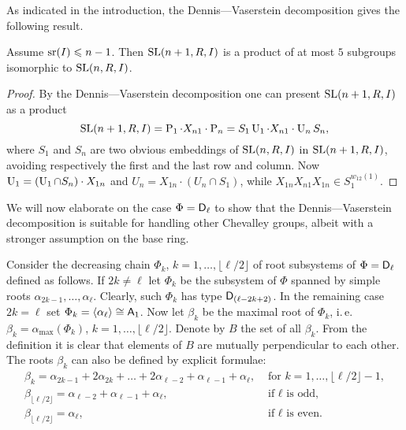 As indicated in the introduction, the Dennis---Vaserstein decomposition gives the following result.
\begin{lemma}
Assume $\operatorname{sr}(I)\leqslant n-1$. Then $\operatorname{SL}(n+1,R,I)$ is a product of at most $5$ subgroups isomorphic to $\operatorname{SL}(n,R,I)$.
\end{lemma}
\begin{proof}
By the Dennis---Vaserstein decomposition one can present $\operatorname{SL}(n+1,R,I)$ as a product
\[ \operatorname{SL}(n+1,R,I) =  \operatorname{P}_1\cdot X_{n1}\cdot\operatorname{P}_n=S_1\operatorname{U}_1\cdot X_{n1}\cdot\operatorname{U}_n S_n, \]
where $S_1$ and $S_n$ are two obvious embeddings of $\operatorname{SL}(n,R,I)$ in $\operatorname{SL}(n+1,R,I)$, avoiding respectively the first and the last row and column. Now $\operatorname{U}_1=(\operatorname{U}_1\cap S_n)\cdot X_{1n}$ and $U_n= X_{1n}\cdot(U_n\cap S_1)$, while $X_{1n}X_{n1}X_{1n}\in S_1^{w_{12}(1)}$.
\end{proof}
We will now elaborate on the case $\Phi=\mathsf{D}_\ell$ to show that the Dennis---Vaserstein decomposition is suitable for handling other Chevalley groups, albeit with a stronger assumption on the base ring. 

Consider the decreasing chain $\Phi_k$, $k=1,\ldots, \lfloor \ell/2 \rfloor$ of root subsystems of $\Phi=\mathsf{D}_\ell$ defined as follows.
If $2k \neq \ell$ let $\Phi_k$ be the subsystem of $\Phi$ spanned by simple roots $\alpha_{2k-1}, \ldots, \alpha_\ell$.
Clearly, such $\Phi_k$ has type $\mathsf{D}_{(\ell-2k+2)}$. 
In the remaining case $2k = \ell$ set $\Phi_k = \langle \alpha_\ell \rangle \cong \mathsf{A}_1$.
Now let $\beta_k$ be the maximal root of $\Phi_k$, i.\,e. $\beta_k = \alpha_\mathrm{max}(\Phi_k)$, $k=1,\ldots, \lfloor \ell/2 \rfloor$.
Denote by $B$ the set of all $\beta_k$. From the definition it is clear that elements of $B$ are mutually perpendicular to each other.
The roots $\beta_k$ can also be defined by explicit formulae:
\begin{align*}
 \beta_k =  \alpha_{2k-1} + 2\alpha_{2k}+ \ldots + 2\alpha_{\ell-2} + \alpha_{\ell-1} + \alpha_\ell, & \text{ for } k=1,\ldots,\lfloor\ell/2\rfloor-1, \\
 \beta_{\lfloor\ell/2\rfloor} = \alpha_{\ell-2}+\alpha_{\ell-1}+\alpha_\ell, & \text{ if $\ell$ is odd,} \\
 \beta_{\lfloor\ell/2\rfloor} = \alpha_\ell, & \text{ if $\ell$ is even.}
\end{align*}

